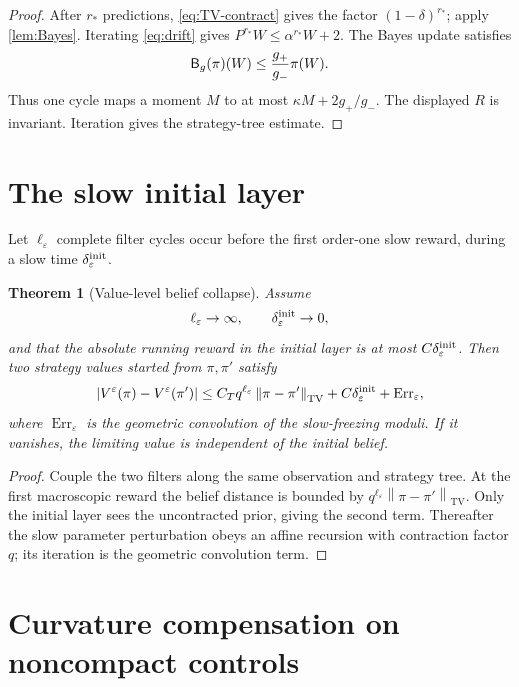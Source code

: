\documentclass[11pt,reqno]{amsart}
\newtheorem{theorem}{Theorem}[section]
\theoremstyle{definition}
\theoremstyle{remark}
\newcommand{\TV}{\mathrm{TV}}
\newcommand{\norm}[1]{\left\lVert #1\right\rVert}
\newcommand{\abs}[1]{\left\lvert #1\right\rvert}
\begin{document}
\begin{proof}
After $r_*$ predictions, \eqref{eq:TV-contract} gives the factor
$(1-\delta)^{r_*}$; apply \cref{lem:Bayes}.  Iterating
\eqref{eq:drift} gives
$P^{r_*}W\le\alpha^{r_*}W+2$.  The Bayes update satisfies
\[
 \mathsf B_g(\pi)(W)\le{g_+\over g_-}\pi(W).
\]
Thus one cycle maps a moment $M$ to at most
$\kappa M+2g_+/g_-$.  The displayed $R$ is invariant.  Iteration gives the
strategy-tree estimate.
\end{proof}

\section{The slow initial layer}

Let $\ell_\varepsilon$ complete filter cycles occur before the first order-one
slow reward, during a slow time $\delta_\varepsilon^{\rm init}$.

\begin{theorem}[Value-level belief collapse]\label{thm:collapse}
Assume
\[
 \ell_\varepsilon\to\infty,
 \qquad \delta_\varepsilon^{\rm init}\to0,
\]
and that the absolute running reward in the initial layer is at most
$C\delta_\varepsilon^{\rm init}$.  Then two strategy values started from
$\pi,\pi'$ satisfy
\begin{equation}\label{eq:collapse}
 \abs{V^\varepsilon(\pi)-V^\varepsilon(\pi')}
 \le C_Tq^{\ell_\varepsilon}\norm{\pi-\pi'}_{\TV}
 +C\delta_\varepsilon^{\rm init}
 +\operatorname{Err}_\varepsilon,
\end{equation}
where $\operatorname{Err}_\varepsilon$ is the geometric convolution of the
slow-freezing moduli.  If it vanishes, the limiting value is independent of the
initial belief.
\end{theorem}

\begin{proof}
Couple the two filters along the same observation and strategy tree.  At the
first macroscopic reward the belief distance is bounded by
$q^{\ell_\varepsilon}\norm{\pi-\pi'}_{\TV}$.  Only the initial layer sees the
uncontracted prior, giving the second term.  Thereafter the slow parameter
perturbation obeys an affine recursion with contraction factor $q$; its
iteration is the geometric convolution term.
\end{proof}

\section{Curvature compensation on noncompact controls}
\end{document}
